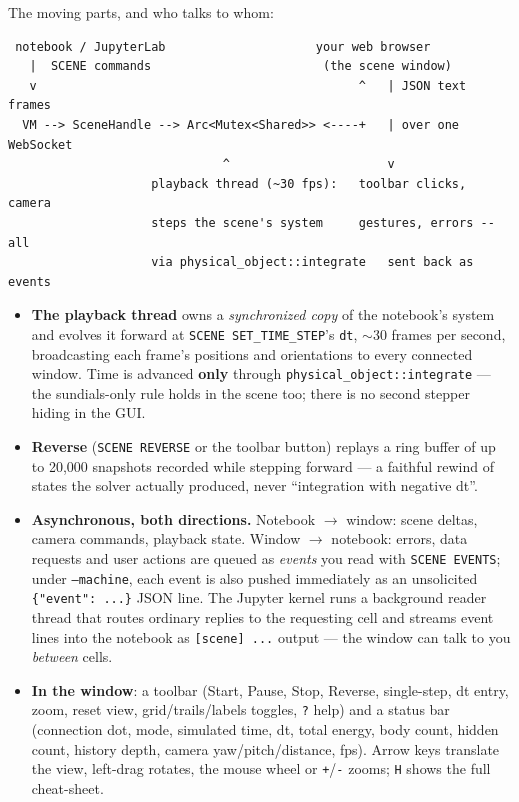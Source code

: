\documentclass[11pt]{article}
\newcommand{\code}[1]{\texttt{#1}}
\begin{document}
The moving parts, and who talks to whom:

\begin{lstlisting}
 notebook / JupyterLab                     your web browser
   |  SCENE commands                        (the scene window)
   v                                             ^   | JSON text frames
  VM --> SceneHandle --> Arc<Mutex<Shared>> <----+   | over one WebSocket
                              ^                      v
                    playback thread (~30 fps):   toolbar clicks, camera
                    steps the scene's system     gestures, errors -- all
                    via physical_object::integrate   sent back as events
\end{lstlisting}

\begin{itemize}
\item \textbf{The playback thread} owns a \emph{synchronized copy} of
      the notebook's system and evolves it forward at
      \code{SCENE SET\_TIME\_STEP}'s \code{dt}, $\sim$30 frames per
      second, broadcasting each frame's positions and orientations to
      every connected window. Time is advanced \textbf{only} through
      \code{physical\_object::integrate} --- the sundials-only rule
      holds in the scene too; there is no second stepper hiding in the
      GUI.
\item \textbf{Reverse} (\code{SCENE REVERSE} or the toolbar button)
      replays a ring buffer of up to 20{,}000 snapshots recorded while
      stepping forward --- a faithful rewind of states the solver
      actually produced, never ``integration with negative dt''.
\item \textbf{Asynchronous, both directions.} Notebook $\to$ window:
      scene deltas, camera commands, playback state. Window $\to$
      notebook: errors, data requests and user actions are queued as
      \emph{events} you read with \code{SCENE EVENTS}; under
      \code{--machine}, each event is also pushed immediately as an
      unsolicited \code{\{"event": ...\}} JSON line. The Jupyter kernel
      runs a background reader thread that routes ordinary replies to
      the requesting cell and streams event lines into the notebook as
      \code{[scene] ...} output --- the window can talk to you
      \emph{between} cells.
\item \textbf{In the window}: a toolbar (Start, Pause, Stop, Reverse,
      single-step, dt entry, zoom, reset view, grid/trails/labels
      toggles, \code{?} help) and a status bar (connection dot, mode,
      simulated time, dt, total energy, body count, hidden count,
      history depth, camera yaw/pitch/distance, fps). Arrow keys
      translate the view, left-drag rotates, the mouse wheel or
      \code{+}/\code{-} zooms; \code{H} shows the full cheat-sheet.
\end{itemize}
\end{document}
